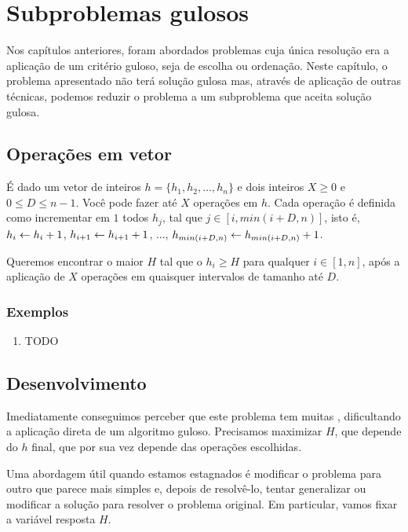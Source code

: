 \chapter{Subproblemas gulosos}
\label{subproblema}

Nos capítulos anteriores, foram abordados problemas cuja única resolução era a aplicação de um critério guloso, seja de escolha ou ordenação. Neste capítulo, o problema apresentado não terá solução gulosa mas, através de aplicação de outras técnicas, podemos reduzir o problema a um subproblema que aceita solução gulosa.

\section{Operações em vetor}

É dado um vetor de inteiros $h = \{h_1, h_2, ..., h_n\}$ e dois inteiros $X \geq 0$ e $0 \leq D \leq n - 1$. Você pode fazer até $X$ operações em $h$. Cada operação é definida como incrementar em $1$ todos $h_j$, tal que $j \in [i, min(i + D, n)]$, isto é, $h_i \leftarrow h_i + 1$, $h_{i + 1} \leftarrow h_{i + 1} + 1$, ..., $h_{min(i + D, n)} \leftarrow h_{min(i + D, n)} + 1$.

Queremos encontrar o maior $H$ tal que o $h_i \geq H$ para qualquer $i \in [1, n]$, após a aplicação de $X$ operações em quaisquer intervalos de tamanho até $D$.

\subsection*{Exemplos}

\begin{enumerate}
    \item TODO
\end{enumerate}

\section{Desenvolvimento}

Imediatamente conseguimos perceber que este problema tem muitas , dificultando a aplicação direta de um algoritmo guloso. Precisamos maximizar $H$, que depende do $h$ final, que por sua vez depende das operações escolhidas.

Uma abordagem útil quando estamos estagnados é modificar o problema para outro que parece mais simples e, depois de resolvê-lo, tentar generalizar ou modificar a solução para resolver o problema original. Em particular, vamos fixar a variável resposta $H$.

